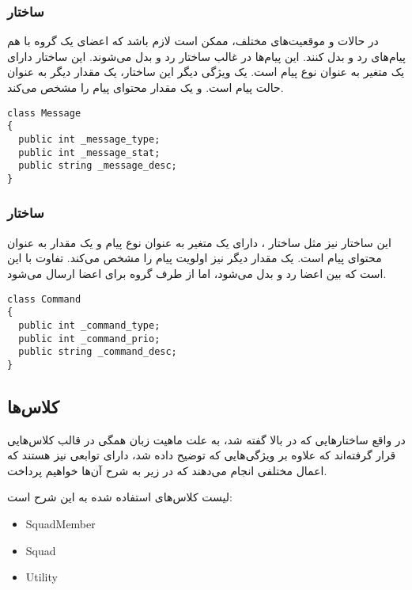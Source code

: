 \subsubsection{ساختار }
در حالات و موقعیت‌های مختلف، ممکن است لازم باشد که اعضای یک گروه با هم پیام‌های رد و بدل کنند. این پیام‌ها
در غالب ساختار  رد و بدل می‌شوند. این ساختار دارای یک متغیر  به عنوان نوع پیام است.
یک ویژگی دیگر این ساختار، یک مقدار  دیگر به عنوان حالت پیام است. و یک مقدار  محتوای پیام
را مشخص می‌کند.

\begin{latin}
{\linespread{1.2}
{\inconsolata
\lstset{language=Java}
\begin{lstlisting}
class Message
{
  public int _message_type;
  public int _message_stat;
  public string _message_desc;
}
\end{lstlisting}
}
}
\end{latin}

\subsubsection{ساختار }
این ساختار نیز مثل ساختار ، دارای یک متغیر  به عنوان نوع پیام و یک مقدار 
به عنوان محتوای پیام است. یک مقدار  دیگر نیز اولویت پیام را مشخص می‌کند. تفاوت  با 
این است که  بین اعضا رد و بدل می‌شود، اما  از طرف گروه برای اعضا ارسال می‌شود.

\begin{latin}
{\linespread{1.2}
{\inconsolata
\lstset{language=Java}
\begin{lstlisting}
class Command
{
  public int _command_type;
  public int _command_prio;
  public string _command_desc;
}
\end{lstlisting}
}
}
\end{latin}

\newpage
\subsection{کلاس‌ها}
در واقع ساختارهایی که در بالا گفته شد، به علت ماهیت زبان  همگی در قالب کلاس‌هایی قرار گرفته‌اند که
علاوه بر ویژگی‌هایی که توضیح داده شد، دارای توابعی نیز هستند که اعمال مختلفی انجام می‌دهند که در زیر
به شرح آن‌ها خواهیم پرداخت.

لیست کلاس‌های استفاده شده به این شرح است:
\begin{latin}
\begin{itemize}
  \item SquadMember
  \item Squad
  \item Utility
\end{itemize}
\end{latin}

